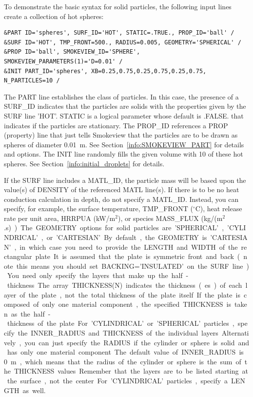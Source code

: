 \documentclass[11pt]{book}
\begin{document}
To demonstrate the basic syntax for solid particles, the following input lines create a collection of hot spheres:
\begin{lstlisting}
&PART ID='spheres', SURF_ID='HOT', STATIC=.TRUE., PROP_ID='ball' /
&SURF ID='HOT', TMP_FRONT=500., RADIUS=0.005, GEOMETRY='SPHERICAL' /
&PROP ID='ball', SMOKEVIEW_ID='SPHERE', SMOKEVIEW_PARAMETERS(1)='D=0.01' /
&INIT PART_ID='spheres', XB=0.25,0.75,0.25,0.75,0.25,0.75, N_PARTICLES=10 /
\end{lstlisting}
The {\ct PART} line establishes the class of particles. In this case, the presence of a {\ct SURF\_ID} indicates that the particles are solids with the properties given by the {\ct SURF} line {\ct 'HOT'}. {\ct STATIC} is a logical parameter whose default is {\ct .FALSE.} that indicates if the particles are stationary. The {\ct PROP\_ID} references a {\ct PROP} (property) line that just tells Smokeview that the particles are to be drawn as spheres of diameter 0.01~m. See Section~\ref{info:SMOKEVIEW_PART} for details and options. The {\ct INIT} line randomly fills the given volume with 10 of these hot spheres. See Section~\ref{info:initial_droplets} for details.

If the {\ct SURF} line includes a {\ct MATL\_ID}, the particle mass will be based upon the value(s) of {\ct DENSITY} of the referenced {\ct MATL} line(s). If there is to be no heat conduction calculation in depth, do not specify a {\ct MATL\_ID}. Instead, you can specify, for example, the surface temperature, {\ct TMP\_FRONT} ($^\circ$C), heat release rate per unit area, {\ct HRRPUA} (kW/m$^2$), or species {\ct MASS\_FLUX} (\si{kg/(m$^2$.s)}).

The {\ct GEOMETRY} options for solid particles are {\ct 'SPHERICAL'}, {\ct 'CYLINDRICAL'}, or {\ct 'CARTESIAN'}.
By default, the {\ct GEOMETRY} is {\ct 'CARTESIAN'}, in which case you need to provide the {\ct LENGTH} and {\ct WIDTH} of the rectangular plate. It is assumed that the plate is symmetric front and back (note this means you should set {\ct BACKING='INSULATED'} on the {\ct SURF} line). You need only specify the layers that make up the half-thickness. The array {\ct THICKNESS(N)} indicates the thickness(es) of each layer of the plate, not the total thickness of the plate itself. If the plate is composed of only one material component, the specified {\ct THICKNESS} is taken as the half-thickness of the plate.

For  {\ct 'CYLINDRICAL'} or {\ct 'SPHERICAL'} particles, specify the {\ct INNER\_RADIUS} and {\ct THICKNESS} of the individual layers. Alternatively, you can just specify the {\ct RADIUS} if the cylinder or sphere is solid and has only one material component. The default value of {\ct INNER\_RADIUS} is 0~m, which means that the radius of the cylinder or sphere is the sum of the {\ct THICKNESS} values. Remember that the layers are to be listed starting at the surface, not the center. For {\ct 'CYLINDRICAL'} particles, specify a {\ct LENGTH} as well.
\end{document}
